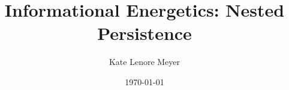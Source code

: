 \documentclass[aps,prd,twocolumn,showpacs,superscriptaddress,groupedaddress,nofootinbib,english]{revtex4-2}
\begin{document}

\title{Informational Energetics: Nested Persistence}

\author{Kate Lenore Meyer}

\date{\today}



\maketitle %
























\appendix



\end{document}

